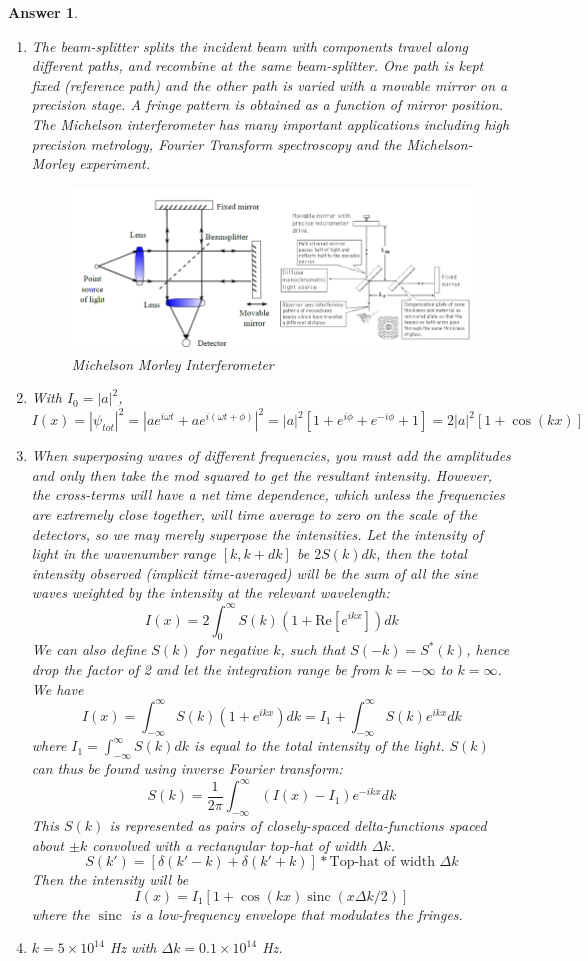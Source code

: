 \documentclass[a4paper]{article}
\DeclareMathOperator{\sinc}{sinc}
\newtheorem{ans}{Answer}[subsection]
\theoremstyle{new}
\begin{document}
\begin{ans}\leavevmode
\begin{enumerate}[label=(\roman*)]
\item The beam-splitter splits the incident beam with components travel along different paths, and recombine at the same beam-splitter. One path is kept fixed (reference path) and the other path is varied with a movable mirror on a precision stage. A fringe pattern is obtained as a function of mirror position. The Michelson interferometer has many important applications including high precision metrology, Fourier Transform spectroscopy and the Michelson-Morley experiment.
\begin{figure}[H]
    \centering
    \includegraphics[width=\linewidth]{mmi.PNG}
    \caption{Michelson Morley Interferometer}
\end{figure}
\item With $I_0=|a|^2$,
$$I(x)=|\psi_{tot}|^2=|ae^{i\omega t}+ae^{i(\omega t+\phi)}|^2=|a|^2[1+e^{i\phi}+e^{-i\phi}+1]=2|a|^2[1+\cos(kx)]$$
\item When superposing waves of different frequencies, you must add the amplitudes and only then take the mod squared to get the resultant intensity. However, the cross-terms will have a net time dependence, which unless the frequencies are extremely close together, will time average to zero on the scale of the detectors, so we may merely superpose the intensities. Let the intensity of light in the wavenumber range $[k,k+dk]$ be $2S(k)dk$, then the total intensity observed (implicit time-averaged) will be the sum of all the sine waves weighted by the intensity at the relevant wavelength:
$$I(x)=2\int_0^\infty S(k)(1+\text{Re}[e^{ikx}])dk$$
We can also define $S(k)$ for negative $k$, such that $S(-k)=S^*(k)$, hence drop the factor of 2 and let the integration range be from $k=-\infty$ to $k=\infty$. We have
$$I(x)=\int_{-\infty}^\infty S(k)(1+e^{ikx})dk=I_1+\int_{-\infty}^\infty S(k)e^{ikx}dk$$
where $I_1=\int_{-\infty}^\infty S(k)dk$ is equal to the total intensity of the light. $S(k)$ can thus be found using inverse Fourier transform:
$$S(k)=\frac{1}{2\pi}\int_{-\infty}^\infty(I(x)-I_1)e^{-ikx}dk$$
This $S(k)$ is represented as pairs of closely-spaced delta-functions spaced about $\pm k$ convolved with a rectangular top-hat of width $\Delta k$.
$$S(k')=[\delta(k'-k)+\delta(k'+k)]*\text{Top-hat of width }\Delta k$$
Then the intensity will be
$$I(x)=I_1[1+\cos(kx)\sinc(x\Delta k/2)]$$
where the $\sinc$ is a low-frequency envelope that modulates the fringes.
\item $k=5\times10^{14}$ Hz with $\Delta k=0.1\times10^{14}$ Hz.
\end{enumerate}
\end{ans}
\newpage
\end{document}
